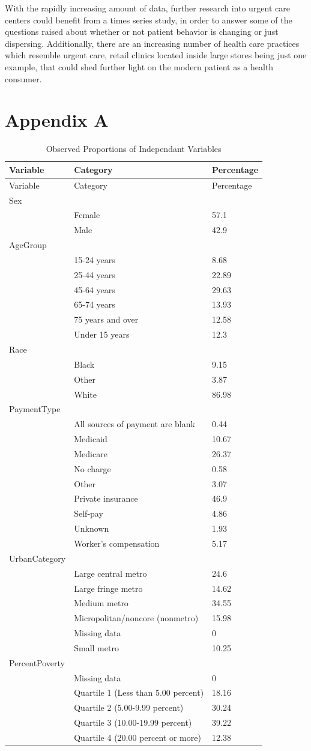 \documentclass[12pt,twoside]{reedthesis}
\begin{document}
  With the rapidly increasing amount of data, further research into urgent
  care centers could benefit from a times series study, in order to answer
  some of the questions raised about whether or not patient behavior is
  changing or just dispersing. Additionally, there are an increasing
  number of health care practices which resemble urgent care, retail
  clinics located inside large stores being just one example, that could
  shed further light on the modern patient as a health consumer.
  
  \chapter*{Appendix A}\label{appendix-a}
  
  \newpage
  \doublespacing
  
  \singlespacing
  
  \begin{longtable}[c]{@{}lll@{}}
  \caption{Observed Proportions of Independant Variables
  \label{tab:sums}}\tabularnewline
  \toprule
  Variable & Category & Percentage\tabularnewline
  \midrule
  \endfirsthead
  \toprule
  Variable & Category & Percentage\tabularnewline
  \midrule
  \endhead
  Sex & &\tabularnewline
  & Female & 57.1\tabularnewline
  & Male & 42.9\tabularnewline
  AgeGroup & &\tabularnewline
  & 15-24 years & 8.68\tabularnewline
  & 25-44 years & 22.89\tabularnewline
  & 45-64 years & 29.63\tabularnewline
  & 65-74 years & 13.93\tabularnewline
  & 75 years and over & 12.58\tabularnewline
  & Under 15 years & 12.3\tabularnewline
  Race & &\tabularnewline
  & Black & 9.15\tabularnewline
  & Other & 3.87\tabularnewline
  & White & 86.98\tabularnewline
  PaymentType & &\tabularnewline
  & All sources of payment are blank & 0.44\tabularnewline
  & Medicaid & 10.67\tabularnewline
  & Medicare & 26.37\tabularnewline
  & No charge & 0.58\tabularnewline
  & Other & 3.07\tabularnewline
  & Private insurance & 46.9\tabularnewline
  & Self-pay & 4.86\tabularnewline
  & Unknown & 1.93\tabularnewline
  & Worker's compensation & 5.17\tabularnewline
  UrbanCategory & &\tabularnewline
  & Large central metro & 24.6\tabularnewline
  & Large fringe metro & 14.62\tabularnewline
  & Medium metro & 34.55\tabularnewline
  & Micropolitan/noncore (nonmetro) & 15.98\tabularnewline
  & Missing data & 0\tabularnewline
  & Small metro & 10.25\tabularnewline
  PercentPoverty & &\tabularnewline
  & Missing data & 0\tabularnewline
  & Quartile 1 (Less than 5.00 percent) & 18.16\tabularnewline
  & Quartile 2 (5.00-9.99 percent) & 30.24\tabularnewline
  & Quartile 3 (10.00-19.99 percent) & 39.22\tabularnewline
  & Quartile 4 (20.00 percent or more) & 12.38\tabularnewline
  \bottomrule
  \end{longtable}
  
\end{document}
